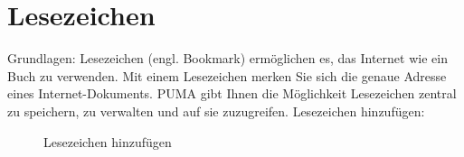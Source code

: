 \section{Lesezeichen} %
Grundlagen:
\newline
Lesezeichen (engl. Bookmark) ermöglichen es, das Internet wie ein Buch zu verwenden. Mit einem Lesezeichen merken Sie sich die genaue Adresse eines Internet-Dokuments. PUMA gibt Ihnen die Möglichkeit Lesezeichen zentral zu speichern, zu verwalten und auf sie zuzugreifen. 
\newline
\newline
Lesezeichen hinzufügen: 
\begin{figure}[h!]
 \centering
 \caption{Lesezeichen hinzufügen}
 \label{figure011}
\end{figure} 
